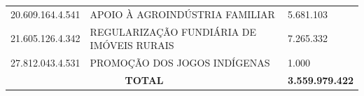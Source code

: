 \documentclass{article}
\begin{document}
\begin{longtable}[c]{m{3cm}|m{12cm}|m{2cm}}
\multicolumn{1}{C{3cm}|}{20.609.164.4.541} & \multicolumn{1}{L{12cm}|}{APOIO À AGROINDÚSTRIA FAMILIAR} & \multicolumn{1}{R{2cm}}{5.681.103} \\
\multicolumn{1}{C{3cm}|}{21.605.126.4.342} & \multicolumn{1}{L{12cm}|}{REGULARIZAÇÃO FUNDIÁRIA DE IMÓVEIS RURAIS} & \multicolumn{1}{R{2cm}}{7.265.332} \\
\multicolumn{1}{C{3cm}|}{27.812.043.4.531} & \multicolumn{1}{L{12cm}|}{PROMOÇÃO DOS JOGOS INDÍGENAS} & \multicolumn{1}{R{2cm}}{1.000} \\
\hline\hline
\multicolumn{2}{c|}{ \textbf{TOTAL}} & \multicolumn{1}{R{2cm}}{ \textbf{3.559.979.422}} \\\hline\hline\end{longtable}
\end{document}
